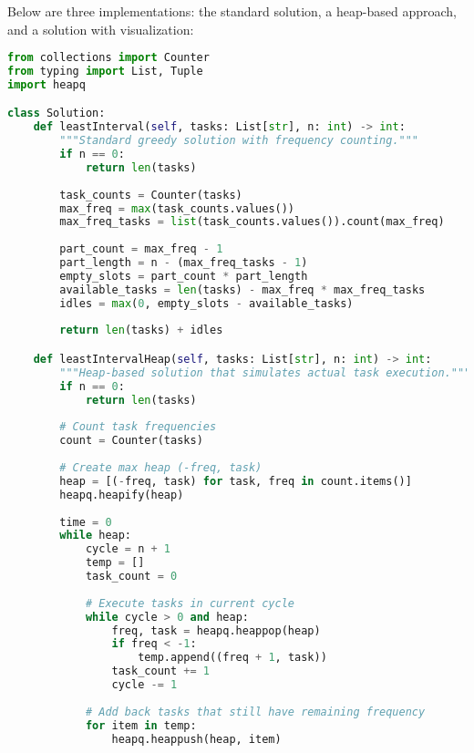 
Below are three implementations: the standard solution, a heap-based approach, and a solution with visualization:

\begin{fullwidth}
\begin{lstlisting}[language=Python]
from collections import Counter
from typing import List, Tuple
import heapq

class Solution:
    def leastInterval(self, tasks: List[str], n: int) -> int:
        """Standard greedy solution with frequency counting."""
        if n == 0:
            return len(tasks)
        
        task_counts = Counter(tasks)
        max_freq = max(task_counts.values())
        max_freq_tasks = list(task_counts.values()).count(max_freq)
        
        part_count = max_freq - 1
        part_length = n - (max_freq_tasks - 1)
        empty_slots = part_count * part_length
        available_tasks = len(tasks) - max_freq * max_freq_tasks
        idles = max(0, empty_slots - available_tasks)
        
        return len(tasks) + idles

    def leastIntervalHeap(self, tasks: List[str], n: int) -> int:
        """Heap-based solution that simulates actual task execution."""
        if n == 0:
            return len(tasks)
            
        # Count task frequencies
        count = Counter(tasks)
        
        # Create max heap (-freq, task)
        heap = [(-freq, task) for task, freq in count.items()]
        heapq.heapify(heap)
        
        time = 0
        while heap:
            cycle = n + 1
            temp = []
            task_count = 0
            
            # Execute tasks in current cycle
            while cycle > 0 and heap:
                freq, task = heapq.heappop(heap)
                if freq < -1:
                    temp.append((freq + 1, task))
                task_count += 1
                cycle -= 1
            
            # Add back tasks that still have remaining frequency
            for item in temp:
                heapq.heappush(heap, item)
            

\end{lstlisting}
\end{fullwidth}
